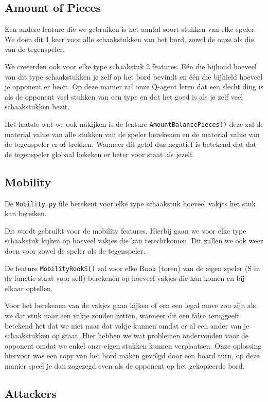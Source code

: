 \documentclass[a4paper,openany]{uantwerpenassignment}
\newcommand{\codeword}[1]{
    \colorbox{code}{\texttt{\textcolor{codetext}{#1}}}
}
\newcommand{\codeword}[1]{
    \colorbox{code}{\texttt{\textcolor{codetext}{#1}}}
}
\begin{document}
\subsection{Amount of Pieces}
Een andere feature die we gebruiken is het aantal soort stukken van elke speler. We doen dit 1 keer voor alle schaakstukken van het bord, zowel de onze als die van de tegenspeler. 

We creëerden ook voor elke type schaakstuk 2 features. Eén die bijhoud hoeveel van dit type schaakstukken je zelf op het bord bevindt en één die bijhield hoeveel je opponent er heeft. Op deze manier zal onze Q-agent leren dat een slecht ding is als de opponent veel stukken van een type en dat het goed is als je zelf veel schaakstukken bezit.

Het laatste wat we ook nakijken is de feature \codeword{AmountBalancePieces()} deze zal de material value van alle stukken van de speler berekenen en de material value van de tegenspeler er af trekken. Wanneer dit getal dus negatief is betekend dat dat de tegenspeler globaal bekeken er beter voor staat als jezelf.

\subsection{Mobility}
De \codeword{Mobility.py} file berekent voor elke type schaakstuk hoeveel vakjes het stuk kan bereiken. 

Dit wordt gebruikt voor de mobility features. Hierbij gaan we voor elke type schaakstuk kijken op hoeveel vakjes die kan terechtkomen. Dit zullen we ook weer doen voor zowel de speler als de tegenspeler.

De feature \codeword{MobilityRookS()} zal voor elke Rook (toren) van de eigen speler (S in de functie staat voor self) berekenen op hoeveel vakjes die kan komen en bij elkaar optellen.

Voor het berekenen van de vakjes gaan kijken of een een legal move zou zijn als we dat stuk naar een vakje zouden zetten, wanneer dit een false teruggeeft betekend het dat we niet naar dat vakje kunnen omdat er al een ander van je schaakstukken op staat. Hier hebben we wat problemen ondervonden voor de opponent omdat we enkel onze eigen stukken kunnen verplaatsen. Onze oplossing hiervoor was een copy van het bord maken gevolgd door een board turn, op deze manier speel je dan zogezegd even als de opponent op het gekopieerde bord. 

\subsection{Attackers}
\end{document}
